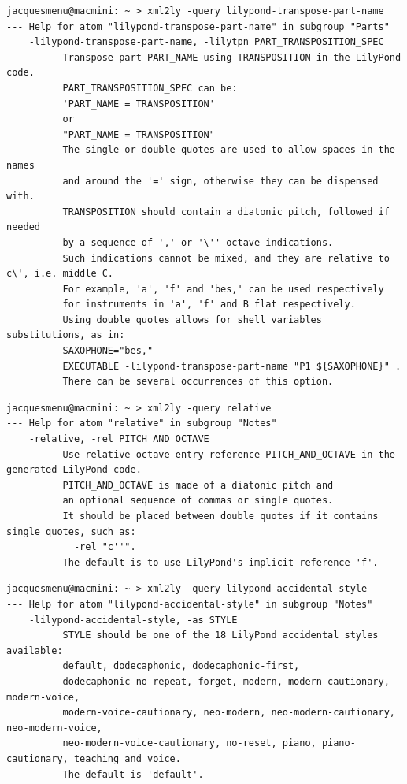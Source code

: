 \begin{lstlisting}[language=Terminal]
jacquesmenu@macmini: ~ > xml2ly -query lilypond-transpose-part-name
--- Help for atom "lilypond-transpose-part-name" in subgroup "Parts"
    -lilypond-transpose-part-name, -lilytpn PART_TRANSPOSITION_SPEC
          Transpose part PART_NAME using TRANSPOSITION in the LilyPond code.
          PART_TRANSPOSITION_SPEC can be:
          'PART_NAME = TRANSPOSITION'
          or
          "PART_NAME = TRANSPOSITION"
          The single or double quotes are used to allow spaces in the names
          and around the '=' sign, otherwise they can be dispensed with.
          TRANSPOSITION should contain a diatonic pitch, followed if needed
          by a sequence of ',' or '\'' octave indications.
          Such indications cannot be mixed, and they are relative to c\', i.e. middle C.
          For example, 'a', 'f' and 'bes,' can be used respectively
          for instruments in 'a', 'f' and B flat respectively.
          Using double quotes allows for shell variables substitutions, as in:
          SAXOPHONE="bes,"
          EXECUTABLE -lilypond-transpose-part-name "P1 ${SAXOPHONE}" .
          There can be several occurrences of this option.
\end{lstlisting}

\begin{lstlisting}[language=Terminal]
jacquesmenu@macmini: ~ > xml2ly -query relative
--- Help for atom "relative" in subgroup "Notes"
    -relative, -rel PITCH_AND_OCTAVE
          Use relative octave entry reference PITCH_AND_OCTAVE in the generated LilyPond code.
          PITCH_AND_OCTAVE is made of a diatonic pitch and
          an optional sequence of commas or single quotes.
          It should be placed between double quotes if it contains single quotes, such as:
            -rel "c''".
          The default is to use LilyPond's implicit reference 'f'.
\end{lstlisting}

\begin{lstlisting}[language=Terminal]
jacquesmenu@macmini: ~ > xml2ly -query lilypond-accidental-style
--- Help for atom "lilypond-accidental-style" in subgroup "Notes"
    -lilypond-accidental-style, -as STYLE
          STYLE should be one of the 18 LilyPond accidental styles available:
          default, dodecaphonic, dodecaphonic-first,
          dodecaphonic-no-repeat, forget, modern, modern-cautionary, modern-voice,
          modern-voice-cautionary, neo-modern, neo-modern-cautionary, neo-modern-voice,
          neo-modern-voice-cautionary, no-reset, piano, piano-cautionary, teaching and voice.
          The default is 'default'.
\end{lstlisting}

